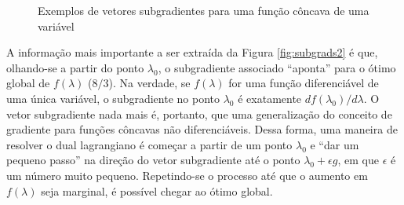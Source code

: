 {\begin{figure}[htpb!]
{{
}

	\label{fig:subgrads2}
}

	\caption{Exemplos de vetores subgradientes para uma função côncava de uma variável}
	\label{fig:exemplosSubrad}
\end{figure}

A informação mais importante a ser extraída da Figura \ref{fig:subgrads2} é que, olhando-se a partir do ponto $\lambda_0$, o subgradiente associado ``aponta'' para o ótimo global de $f(\lambda)$ ($8/3$). Na verdade, se $f(\lambda)$ for uma função diferenciável de uma única variável, o subgradiente no ponto  $\lambda_0$ é exatamente $df(\lambda_0)/d\lambda$. O vetor subgradiente nada mais é, portanto, que uma generalização do conceito de gradiente para funções côncavas não diferenciáveis. Dessa forma, uma maneira de resolver o dual lagrangiano é começar a partir de um ponto $\lambda_0$ e ``dar um pequeno passo'' na direção do vetor subgradiente até o ponto $\lambda_0 + \epsilon g$, em que $\epsilon$ é um número muito pequeno. Repetindo-se o processo até que o aumento em $f(\lambda)$ seja marginal, é possível chegar ao ótimo global. 

}

